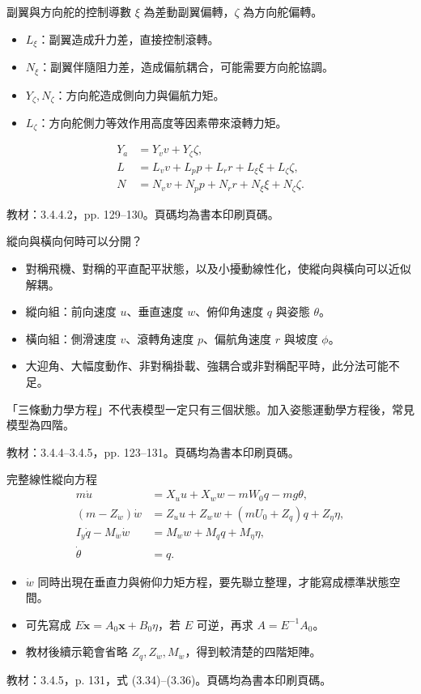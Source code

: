 \documentclass[aspectratio=169,11pt]{beamer}
\newcommand{\src}[1]{\par\vfill{\scriptsize\color{teal}教材：#1。頁碼均為書本印刷頁碼。}}
\newcommand{\slide}[3]{\begin{frame}[t]{#1}#3\src{#2}\end{frame}}
\newcommand{\bi}{\begin{itemize}\setlength{\itemsep}{5pt}}
\newcommand{\ei}{\end{itemize}}
\newcommand{\key}[1]{\par\medskip{\color{teal}\bfseries #1}\par\smallskip}
\begin{document}
\slide{副翼與方向舵的控制導數}{3.4.4.2，pp. 129--130}{
\small
$\xi$ 為差動副翼偏轉，$\zeta$ 為方向舵偏轉。
\bi
\item $L_\xi$：副翼造成升力差，直接控制滾轉。
\item $N_\xi$：副翼伴隨阻力差，造成偏航耦合，可能需要方向舵協調。
\item $Y_\zeta,N_\zeta$：方向舵造成側向力與偏航力矩。
\item $L_\zeta$：方向舵側力等效作用高度等因素帶來滾轉力矩。
\ei
\[\begin{aligned}
Y_a&=Y_vv+Y_\zeta\zeta,\\
L&=L_vv+L_pp+L_rr+L_\xi\xi+L_\zeta\zeta,\\
N&=N_vv+N_pp+N_rr+N_\xi\xi+N_\zeta\zeta.
\end{aligned}\]
}
\slide{縱向與橫向何時可以分開？}{3.4.4--3.4.5，pp. 123--131}{
\bi
\item 對稱飛機、對稱的平直配平狀態，以及小擾動線性化，使縱向與橫向可以近似解耦。
\item 縱向組：前向速度 $u$、垂直速度 $w$、俯仰角速度 $q$ 與姿態 $\theta$。
\item 橫向組：側滑速度 $v$、滾轉角速度 $p$、偏航角速度 $r$ 與坡度 $\phi$。
\item 大迎角、大幅度動作、非對稱掛載、強耦合或非對稱配平時，此分法可能不足。
\ei
\key{階數提醒}「三條動力學方程」不代表模型一定只有三個狀態。加入姿態運動學方程後，常見模型為四階。
}
\slide{完整線性縱向方程}{3.4.5，p. 131，式 (3.34)--(3.36)}{
\small
\[\begin{aligned}
m\dot u&=X_u u+X_w w-mW_0q-mg\theta,\\
(m-Z_{\dot w})\dot w&=Z_u u+Z_w w+(mU_0+Z_q)q+Z_\eta\eta,\\
I_y\dot q-M_{\dot w}\dot w&=M_w w+M_q q+M_\eta\eta,\\
\dot\theta&=q.
\end{aligned}\]
\bi
\item $\dot w$ 同時出現在垂直力與俯仰力矩方程，要先聯立整理，才能寫成標準狀態空間。
\item 可先寫成 $E\dot{\mathbf x}=A_0\mathbf x+B_0\eta$，若 $E$ 可逆，再求 $A=E^{-1}A_0$。
\item 教材後續示範會省略 $Z_q,Z_{\dot w},M_{\dot w}$，得到較清楚的四階矩陣。
\ei
}
\end{document}
